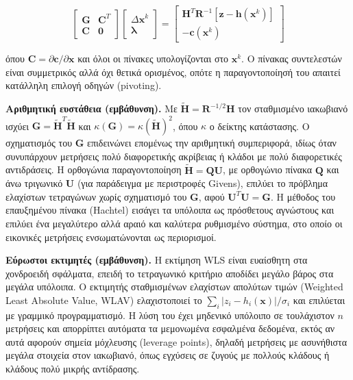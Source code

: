 \begin{equation}
\begin{bmatrix} \mathbf{G} & \mathbf{C}^{T} \\ \mathbf{C} & \mathbf{0} \end{bmatrix}
\begin{bmatrix} \Delta\mathbf{x}^{k} \\ \boldsymbol{\lambda} \end{bmatrix}
=
\begin{bmatrix} \mathbf{H}^{T}\mathbf{R}^{-1}\left[\mathbf{z} - \mathbf{h}(\mathbf{x}^{k})\right] \\ -\mathbf{c}(\mathbf{x}^{k}) \end{bmatrix}
\label{eq:eqconstr}
\end{equation}

όπου $\mathbf{C} = \partial\mathbf{c}/\partial\mathbf{x}$ και όλοι οι πίνακες υπολογίζονται στο
$\mathbf{x}^{k}$. Ο πίνακας συντελεστών είναι συμμετρικός αλλά όχι θετικά ορισμένος, οπότε η
παραγοντοποίησή του απαιτεί κατάλληλη επιλογή οδηγών (pivoting).

\textbf{Αριθμητική ευστάθεια (εμβάθυνση).} Με $\tilde{\mathbf{H}} = \mathbf{R}^{-1/2}\mathbf{H}$ τον
σταθμισμένο ιακωβιανό ισχύει $\mathbf{G} = \tilde{\mathbf{H}}^{T}\tilde{\mathbf{H}}$ και
$\kappa(\mathbf{G}) = \kappa(\tilde{\mathbf{H}})^2$, όπου $\kappa$ ο δείκτης κατάστασης. Ο
σχηματισμός του $\mathbf{G}$ επιδεινώνει επομένως την αριθμητική συμπεριφορά, ιδίως όταν
συνυπάρχουν μετρήσεις πολύ διαφορετικής ακρίβειας ή κλάδοι με πολύ διαφορετικές αντιδράσεις.
Η ορθογώνια παραγοντοποίηση $\tilde{\mathbf{H}} = \mathbf{Q}\mathbf{U}$, με ορθογώνιο πίνακα
$\mathbf{Q}$ και άνω τριγωνικό $\mathbf{U}$ (για παράδειγμα με περιστροφές Givens), επιλύει το
πρόβλημα ελαχίστων τετραγώνων χωρίς σχηματισμό του $\mathbf{G}$, αφού
$\mathbf{U}^{T}\mathbf{U} = \mathbf{G}$. Η μέθοδος του επαυξημένου πίνακα (Hachtel) εισάγει τα
υπόλοιπα ως πρόσθετους αγνώστους και επιλύει ένα μεγαλύτερο αλλά αραιό και καλύτερα
ρυθμισμένο σύστημα, στο οποίο οι εικονικές μετρήσεις ενσωματώνονται ως περιορισμοί.

\textbf{Εύρωστοι εκτιμητές (εμβάθυνση).} Η εκτίμηση WLS είναι ευαίσθητη στα χονδροειδή σφάλματα, επειδή
το τετραγωνικό κριτήριο αποδίδει μεγάλο βάρος στα μεγάλα υπόλοιπα. Ο εκτιμητής σταθμισμένων
ελαχίστων απολύτων τιμών (Weighted Least Absolute Value, WLAV) ελαχιστοποιεί το
$\sum_{i} |z_i - h_i(\mathbf{x})|/\sigma_i$ και επιλύεται με γραμμικό προγραμματισμό. Η λύση του έχει μηδενικό υπόλοιπο σε τουλάχιστον $n$ μετρήσεις και απορρίπτει αυτόματα τα μεμονωμένα εσφαλμένα
δεδομένα, εκτός αν αυτά αφορούν σημεία μόχλευσης (leverage points), δηλαδή μετρήσεις με
ασυνήθιστα μεγάλα στοιχεία στον ιακωβιανό, όπως εγχύσεις σε ζυγούς με πολλούς κλάδους ή
κλάδους πολύ μικρής αντίδρασης.

